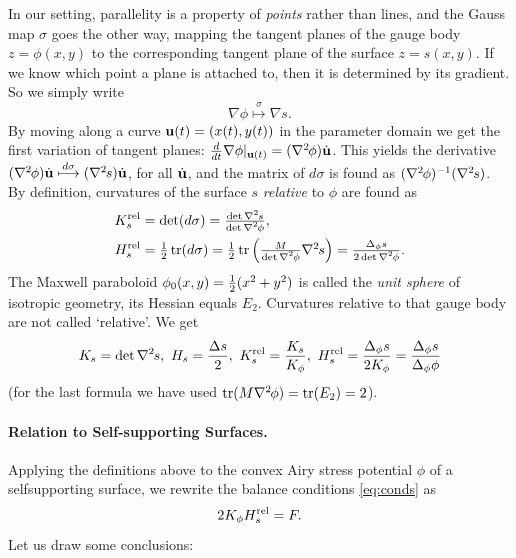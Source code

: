 \documentclass[annual]{acmsiggraph}
\def\tr{\mathop{{\rm tr}}\nolimits}
\def\rel{{\mathord{\text{\rm rel}}}}
\def\ess{s}
\def\Hess#1{{\def\testess{#1}\nabla^2\ifx\testess\ess\!s\else #1\fi}}
\def\Hess#1{\text{$\nabla^2\hskip-.2ex #1$}}
\begin{document}
In our setting, parallelity is a property of {\em points} rather than
lines, and the Gauss map $\sigma$ goes the other way, mapping the tangent
planes of the gauge body $z=\phi(x,y)$ to the corresponding tangent plane
of the surface $z=s(x,y)$. If we know which point a plane is attached to,
then it is determined by its gradient. So we simply write
	$$\nabla \phi\overset\sigma\longmapsto\nabla s.
	$$
 By moving along a curve ${\mathbf u}(t)=(x(t),y(t))$ in the parameter domain we
get the first variation of tangent planes:
	$
	{d\over dt}\nabla \phi|_{\uw(t)} =
	(\Hess\phi)\dot\uw
	$.
 This yields the derivative
	$	
	(\Hess\phi)\dot\uw \overset{d\sigma}\longmapsto
	(\Hess s)\dot\uw $,
 for all $\dot{{\mathbf u}}$, and the matrix of $d\sigma$ is found as
$(\Hess\phi)^{-1}(\Hess s)$.  By definition, curvatures of the surface $s$
{\em relative} to $\phi$ are found as
	\begin{align*}
		K_s^\rel
	& = \textstyle
		\det(d\sigma) =
		{\det\Hess s \over \det\Hess\phi} ,
	\\
		H_s^\rel
	&= \textstyle
		{1\over 2}\tr(d\sigma)
		= {1\over 2}\tr \left({M\over\det\Hess\phi} \Hess s\right)
		=  {\Delta_\phi s \over 2\det\Hess\phi}.
	\end{align*}
 The Maxwell paraboloid $\phi_0(x,y)={1\over 2}(x^2+y^2)$ is called the
{\em unit sphere} of isotropic geometry, its Hessian equals $E_2$.
Curvatures relative to that gauge body are not called `relative'. We get
	\begin{align*}
	K_s = \det \Hess s,
		\
	H_s = {\Delta s \over 2},
		\
	K_s^\rel = {K_s\over K_\phi},
		\
	H_s^\rel =  {\Delta_\phi s \over 2 K_\phi}
			= {\Delta_\phi s\over \Delta_\phi \phi}
	\end{align*}
 (for the last formula we have used $\tr (M\Hess\phi)=\tr(E_2)=2$).

\paragraph{Relation to Self-supporting Surfaces.}

Applying the definitions above to the convex Airy stress potential $\phi$
of a self\dash supporting surface, we rewrite the balance conditions
\eqref{eq:conds} as
	\begin{equation}
	2 K_\phi H_s^\rel  = F.
	\label{equigeo}
	\end{equation}
 Let us draw some conclusions:
\end{document}
